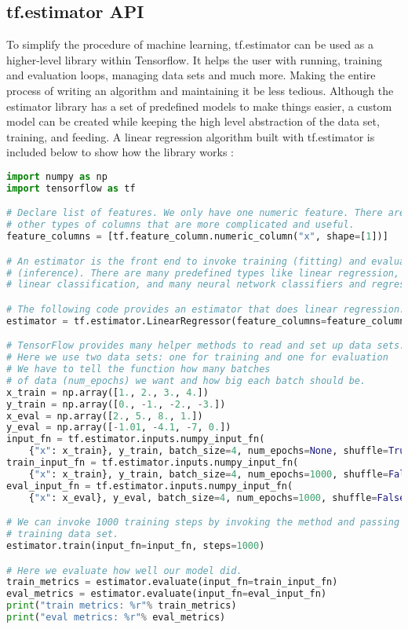 \subsection{tf.estimator API}
To simplify the procedure of machine learning,
tf.estimator can be used as a higher-level library within Tensorflow.
It helps the user with running, training and evaluation loops, managing data sets and much more. 
Making the entire process of writing an algorithm and maintaining it be less tedious.
Although the estimator library has a set of predefined models to make things easier, a custom model can be created while keeping the high
level abstraction of the data set, training, and feeding.
A linear regression algorithm built with tf.estimator is included below to show how the library works \cite{Estimator}:
\begin{lstlisting}[language=Python, flexiblecolumns=true, caption=Linear regression algorithm built with tf.estimator.]
import numpy as np
import tensorflow as tf

# Declare list of features. We only have one numeric feature. There are many
# other types of columns that are more complicated and useful.
feature_columns = [tf.feature_column.numeric_column("x", shape=[1])]

# An estimator is the front end to invoke training (fitting) and evaluation
# (inference). There are many predefined types like linear regression,
# linear classification, and many neural network classifiers and regressors.

# The following code provides an estimator that does linear regression.
estimator = tf.estimator.LinearRegressor(feature_columns=feature_columns)

# TensorFlow provides many helper methods to read and set up data sets.
# Here we use two data sets: one for training and one for evaluation
# We have to tell the function how many batches
# of data (num_epochs) we want and how big each batch should be.
x_train = np.array([1., 2., 3., 4.])
y_train = np.array([0., -1., -2., -3.])
x_eval = np.array([2., 5., 8., 1.])
y_eval = np.array([-1.01, -4.1, -7, 0.])
input_fn = tf.estimator.inputs.numpy_input_fn(
    {"x": x_train}, y_train, batch_size=4, num_epochs=None, shuffle=True)
train_input_fn = tf.estimator.inputs.numpy_input_fn(
    {"x": x_train}, y_train, batch_size=4, num_epochs=1000, shuffle=False)
eval_input_fn = tf.estimator.inputs.numpy_input_fn(
    {"x": x_eval}, y_eval, batch_size=4, num_epochs=1000, shuffle=False)

# We can invoke 1000 training steps by invoking the method and passing the
# training data set.
estimator.train(input_fn=input_fn, steps=1000)

# Here we evaluate how well our model did.
train_metrics = estimator.evaluate(input_fn=train_input_fn)
eval_metrics = estimator.evaluate(input_fn=eval_input_fn)
print("train metrics: %r"% train_metrics)
print("eval metrics: %r"% eval_metrics)
\end{lstlisting}

